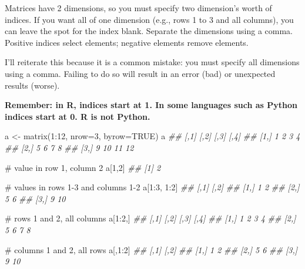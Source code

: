 \documentclass[
  13,
  letterpaper,
]{report}
\newenvironment{Shaded}{\begin{snugshade}}{\end{snugshade}}
\newcommand{\AttributeTok}[1]{\textcolor[rgb]{0.40,0.45,0.13}{#1}}
\newcommand{\CommentTok}[1]{\textcolor[rgb]{0.37,0.37,0.37}{#1}}
\newcommand{\ConstantTok}[1]{\textcolor[rgb]{0.56,0.35,0.01}{#1}}
\newcommand{\DecValTok}[1]{\textcolor[rgb]{0.68,0.00,0.00}{#1}}
\newcommand{\DocumentationTok}[1]{\textcolor[rgb]{0.37,0.37,0.37}{\textit{#1}}}
\newcommand{\FunctionTok}[1]{\textcolor[rgb]{0.28,0.35,0.67}{#1}}
\newcommand{\NormalTok}[1]{\textcolor[rgb]{0.00,0.23,0.31}{#1}}
\newcommand{\OtherTok}[1]{\textcolor[rgb]{0.00,0.23,0.31}{#1}}
\newcommand{\SpecialCharTok}[1]{\textcolor[rgb]{0.37,0.37,0.37}{#1}}
\begin{document}
Matrices have 2 dimensions, so you must specify two dimension's worth of
indices. If you want all of one dimension (e.g., rows 1 to 3 and all
columns), you can leave the spot for the index blank. Separate the
dimensions using a comma. Positive indices select elements; negative
elements remove elements.

I'll reiterate this because it is a common mistake: you must specify all
dimensions using a comma. Failing to do so will result in an error (bad)
or unexpected results (worse).

\textbf{Remember: in R, indices start at 1. In some languages such as
Python indices start at 0. R is not Python.}

\begin{Shaded}
\begin{Highlighting}[]

\NormalTok{a }\OtherTok{\textless{}{-}} \FunctionTok{matrix}\NormalTok{(}\DecValTok{1}\SpecialCharTok{:}\DecValTok{12}\NormalTok{, }\AttributeTok{nrow=}\DecValTok{3}\NormalTok{, }\AttributeTok{byrow=}\ConstantTok{TRUE}\NormalTok{)}
\NormalTok{a}
\DocumentationTok{\#\#      [,1] [,2] [,3] [,4]}
\DocumentationTok{\#\# [1,]    1    2    3    4}
\DocumentationTok{\#\# [2,]    5    6    7    8}
\DocumentationTok{\#\# [3,]    9   10   11   12}

\CommentTok{\# value in row 1, column 2}
\NormalTok{a[}\DecValTok{1}\NormalTok{,}\DecValTok{2}\NormalTok{]}
\DocumentationTok{\#\# [1] 2}

\CommentTok{\# values in rows 1{-}3 and columns 1{-}2}
\NormalTok{a[}\DecValTok{1}\SpecialCharTok{:}\DecValTok{3}\NormalTok{, }\DecValTok{1}\SpecialCharTok{:}\DecValTok{2}\NormalTok{]}
\DocumentationTok{\#\#      [,1] [,2]}
\DocumentationTok{\#\# [1,]    1    2}
\DocumentationTok{\#\# [2,]    5    6}
\DocumentationTok{\#\# [3,]    9   10}

\CommentTok{\# rows 1 and 2, all columns}
\NormalTok{a[}\DecValTok{1}\SpecialCharTok{:}\DecValTok{2}\NormalTok{,]}
\DocumentationTok{\#\#      [,1] [,2] [,3] [,4]}
\DocumentationTok{\#\# [1,]    1    2    3    4}
\DocumentationTok{\#\# [2,]    5    6    7    8}

\CommentTok{\# columns 1 and 2, all rows}
\NormalTok{a[,}\DecValTok{1}\SpecialCharTok{:}\DecValTok{2}\NormalTok{]}
\DocumentationTok{\#\#      [,1] [,2]}
\DocumentationTok{\#\# [1,]    1    2}
\DocumentationTok{\#\# [2,]    5    6}
\DocumentationTok{\#\# [3,]    9   10}
\end{Highlighting}
\end{Shaded}
\end{document}
